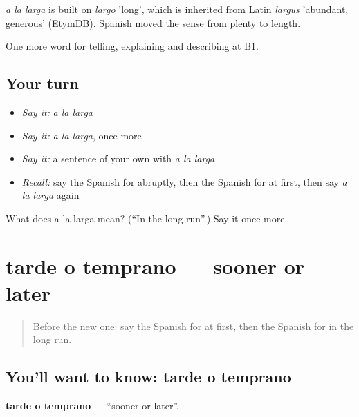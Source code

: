 \begin{cousinweb}
\emph{a la larga} is built on \emph{largo} 'long', which is inherited from Latin \emph{largus} 'abundant, generous' (EtymDB). Spanish moved the sense from plenty to length.
\end{cousinweb}

\begin{grammarlens}[title={What you've built}]
One more word for telling, explaining and describing at B1.
\end{grammarlens}

\subsection*{Your turn}
\begin{itemize}
\raggedright
  \item \emph{Say it:} \emph{a la larga}
  \item \emph{Say it:} \emph{a la larga}, once more
  \item \emph{Say it:} a sentence of your own with \emph{a la larga}
  \item \emph{Recall:} say the Spanish for abruptly, then the Spanish for at first, then say \emph{a la larga} again
\end{itemize}

\begin{tcolorbox}[breakable,colback=teal!4,colframe=teal!35!black,title={Before you move on}]
What does a la larga mean? (\textquotedblleft{}In the long run\textquotedblright{}.) Say it once more.
\end{tcolorbox}
\section[tarde o temprano]{tarde o temprano — sooner or later}

\label{lesson:ES-C535-tarde-o-temprano}



\begin{quote}
Before the new one: say the Spanish for at first, then the Spanish for in the long run.
\end{quote}

\subsection*{You'll want to know: tarde o temprano}
\textbf{tarde o temprano} — \textquotedblleft{}sooner or later\textquotedblright{}.


